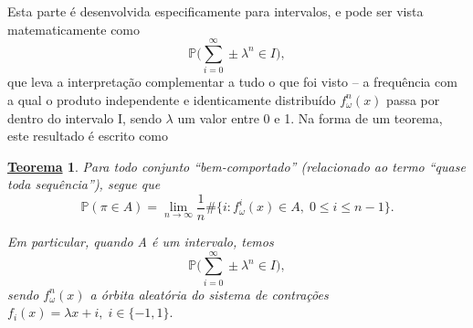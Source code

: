 \documentclass[12pt]{article}
\newtheorem*{theorem*}{\underline{Teorema}}
\theoremstyle{definition}
\begin{document}
Esta parte é desenvolvida especificamente para intervalos, e pode ser vista matematicamente como
\[
	\mathbb{P}\biggl(\sum_{i=0}^{\infty}\pm \lambda^{n}\in I\biggr),
\]
que leva a interpretação complementar a tudo o que foi visto -- a frequência com a qual o produto independente e identicamente distribuído \(f_{\omega }^{n}(x)\) passa por dentro do intervalo I, sendo \(\lambda \) um valor entre 0 e 1. Na forma de um teorema, este resultado é escrito como
\begin{theorem*}
	Para todo conjunto ``bem-comportado'' (relacionado ao termo ``quase toda sequência''), segue que
	\[
		\mathbb{P}(\pi \in A) = \lim_{n\to \infty}\frac{1}{n}\# \biggl\{i: f_{\omega }^{i}(x)\in A,\; 0\leq i\leq n-1\biggr\}.
	\]

	Em particular, quando A é um intervalo, temos
	\[
		\mathbb{P}\biggl(\sum_{i=0}^{\infty}\pm \lambda^{n}\in I\biggr),
	\]
	sendo \(f_{\omega }^{n}(x)\) a órbita aleatória do sistema de contrações \(f_{i}(x) = \lambda x + i,\; i\in \{-1, 1\}.\)
\end{theorem*}
\end{document}
